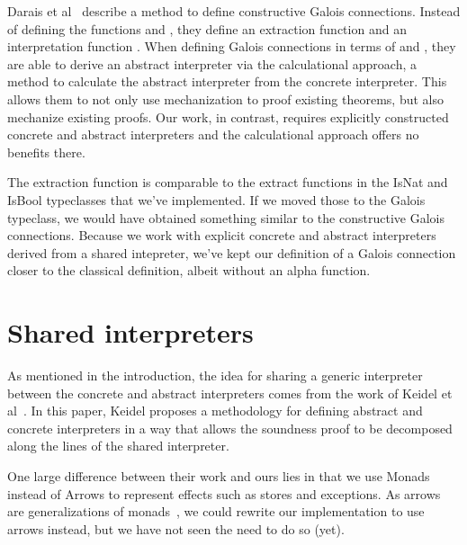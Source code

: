 Darais et al~\cite{darais2019constructive} describe a method to define
constructive Galois connections.
Instead of defining the functions  
and , they define an extraction function 
 and
an interpretation function . 
When defining Galois connections in terms of  and , they
are able to derive an abstract interpreter via the calculational approach, a
method to calculate the abstract interpreter from the concrete interpreter.
This allows them to not only use mechanization to proof existing theorems, but
also mechanize existing proofs. 
Our work, in contrast, requires explicitly constructed concrete and abstract
interpreters and the calculational approach offers no benefits there.

The extraction function is comparable to the extract functions in the
IsNat and IsBool typeclasses that we've implemented. If we moved those to the
Galois typeclass, we would have obtained something similar to the constructive
Galois connections. Because we work with explicit concrete and abstract
interpreters derived from a shared intepreter, we've kept our definition of a
Galois connection closer to the classical definition, albeit without an alpha
function.


\section{Shared interpreters}
As mentioned in the introduction, the idea for sharing a generic interpreter
between the concrete and abstract interpreters comes from the work of Keidel et
al~\cite{keidel2020compositional}. In this paper, Keidel proposes a
methodology for defining abstract and concrete interpreters in a way that
allows the soundness proof to be decomposed along the lines of the shared
interpreter.

One large difference between their work and ours
lies in that we use Monads instead of Arrows to represent 
effects such as stores and exceptions. As
arrows are generalizations of monads~\cite{hughes2000generalising}, we could
rewrite our implementation to use arrows instead, but we have not seen the need
to do so (yet). 

